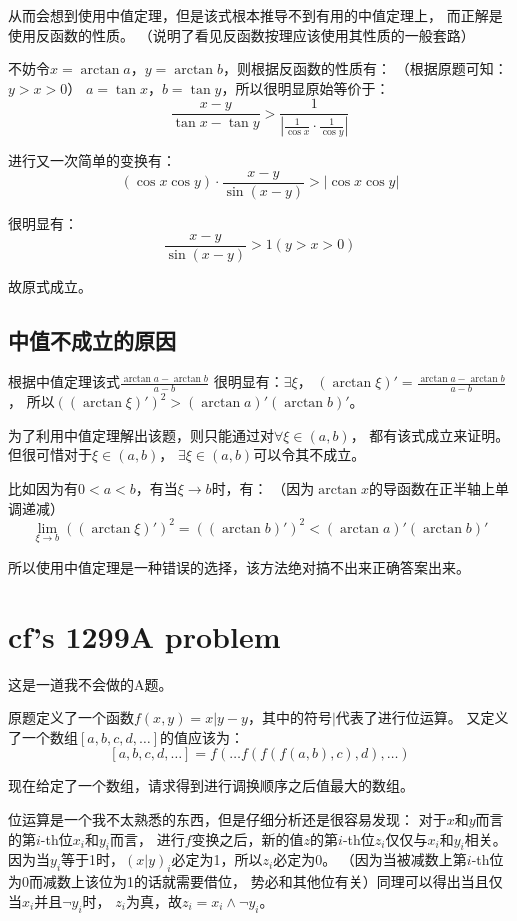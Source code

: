从而会想到使用中值定理，但是该式根本推导不到有用的中值定理上，
而正解是使用反函数的性质。
（说明了看见反函数按理应该使用其性质的一般套路）

不妨令$x=\arctan a$，$y=\arctan b$，则根据反函数的性质有：
（根据原题可知：$y>x>0$）
$a=\tan x$，$b=\tan y$，所以很明显原始等价于：
$$\frac{x-y}{\tan x-\tan y}>
\frac{1}{|\frac{1}{\cos x}\cdot\frac{1}{\cos y}|}$$

进行又一次简单的变换有：
$$(\cos x\cos y)\cdot\frac{x-y}{\sin(x-y)}>|\cos x\cos y|$$

很明显有：
$$\frac{x-y}{\sin(x-y)}>1(y>x>0)$$

故原式成立。

\subsection{中值不成立的原因}
根据中值定理该式$\frac{\arctan a-\arctan b}{a-b}$
很明显有：$\exists \xi$，
$(\arctan\xi)'=\frac{\arctan a-\arctan b}{a-b}$，
所以$((\arctan\xi)')^2>(\arctan a)'(\arctan b)'$。

为了利用中值定理解出该题，则只能通过对$\forall\xi\in(a, b)$，
都有该式成立来证明。但很可惜对于$\xi\in(a, b)$，
$\exists\xi\in(a, b)$可以令其不成立。

比如因为有$0<a<b$，有当$\xi\to b$时，有：
（因为$\arctan x$的导函数在正半轴上单调递减）
$$\lim_{\xi\to b}((\arctan\xi)')^2=
((\arctan b)')^2<
(\arctan a)'(\arctan b)'$$

所以使用中值定理是一种错误的选择，该方法绝对搞不出来正确答案出来。


\section{cf's 1299A problem}

这是一道我不会做的A题。

原题定义了一个函数$f(x, y)=x|y-y$，其中的符号$|$代表了进行位运算。
又定义了一个数组$[a, b, c, d, \ldots]$的值应该为：
$$[a, b, c, d, \ldots] = f(\ldots f(f(f(a, b), c), d), \ldots)$$

现在给定了一个数组，请求得到进行调换顺序之后值最大的数组。

位运算是一个我不太熟悉的东西，但是仔细分析还是很容易发现：
对于$x$和$y$而言的第$i$-th位$x_i$和$y_i$而言，
进行$f$变换之后，新的值$z$的第$i$-th位$z_i$仅仅与$x_i$和$y_i$相关。
因为当$y_i$等于1时，$(x|y)_i$必定为1，所以$z_i$必定为0。
（因为当被减数上第$i$-th位为0而减数上该位为1的话就需要借位，
势必和其他位有关）同理可以得出当且仅当$x_i$并且$\lnot y_i$时，
$z_i$为真，故$z_i=x_i\land\lnot y_i$。

